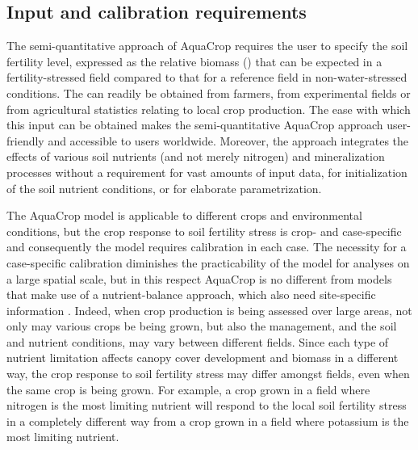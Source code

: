 \subsection{Input and calibration requirements}
The semi-quantitative approach of AquaCrop requires the user to specify the soil fertility level, expressed as the relative biomass (\Brel) that can be expected in a fertility-stressed field compared to that for a reference field in non-water-stressed conditions. The \Brel can readily be obtained from farmers, from experimental fields or from agricultural statistics relating to local crop production. The ease with which this input can be obtained makes the semi-quantitative AquaCrop approach user-friendly and accessible to users worldwide. Moreover, the approach integrates the effects of various soil nutrients (and not merely nitrogen) and mineralization processes without a requirement for vast amounts of input data, for initialization of the soil nutrient conditions, or for elaborate parametrization.

The AquaCrop model is applicable to different crops and environmental conditions, but the crop response to soil fertility stress is crop- and case-specific and consequently the model requires calibration in each case. The necessity for a case-specific calibration diminishes the practicability of the model for analyses on a large spatial scale, but in this respect AquaCrop is no different from models that make use of a nutrient-balance approach, which also need site-specific information \parencite{gabrielle2002, matthews2002c}. Indeed, when crop production is being assessed over large areas, not only may various crops be being grown, but also the management, and the soil and nutrient conditions, may vary between different fields. Since each type of nutrient limitation affects canopy cover development and biomass in a different way, the crop response to soil fertility stress may differ amongst fields, even when the same crop is being grown. For example, a crop grown in a field where nitrogen is the most limiting nutrient will respond to the local soil fertility stress in a completely different way from a crop grown in a field where potassium is the most limiting nutrient. 

